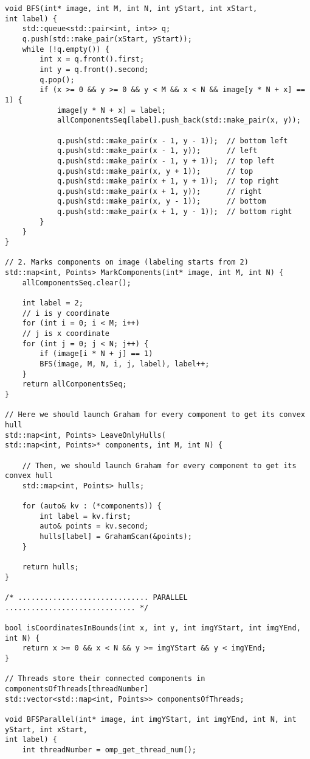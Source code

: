 \documentclass[14pt, russian]{extarticle}
\begin{document}
\begin{lstlisting}
void BFS(int* image, int M, int N, int yStart, int xStart,
int label) {
	std::queue<std::pair<int, int>> q;
	q.push(std::make_pair(xStart, yStart));
	while (!q.empty()) {
		int x = q.front().first;
		int y = q.front().second;
		q.pop();
		if (x >= 0 && y >= 0 && y < M && x < N && image[y * N + x] == 1) {
			image[y * N + x] = label;
			allComponentsSeq[label].push_back(std::make_pair(x, y));
			
			q.push(std::make_pair(x - 1, y - 1));  // bottom left
			q.push(std::make_pair(x - 1, y));      // left
			q.push(std::make_pair(x - 1, y + 1));  // top left
			q.push(std::make_pair(x, y + 1));      // top
			q.push(std::make_pair(x + 1, y + 1));  // top right
			q.push(std::make_pair(x + 1, y));      // right
			q.push(std::make_pair(x, y - 1));      // bottom
			q.push(std::make_pair(x + 1, y - 1));  // bottom right
		}
	}
}

// 2. Marks components on image (labeling starts from 2)
std::map<int, Points> MarkComponents(int* image, int M, int N) {
	allComponentsSeq.clear();
	
	int label = 2;
	// i is y coordinate
	for (int i = 0; i < M; i++)
	// j is x coordinate
	for (int j = 0; j < N; j++) {
		if (image[i * N + j] == 1)
		BFS(image, M, N, i, j, label), label++;
	}
	return allComponentsSeq;
}

// Here we should launch Graham for every component to get its convex hull
std::map<int, Points> LeaveOnlyHulls(
std::map<int, Points>* components, int M, int N) {
	
	// Then, we should launch Graham for every component to get its convex hull
	std::map<int, Points> hulls;
	
	for (auto& kv : (*components)) {
		int label = kv.first;
		auto& points = kv.second;
		hulls[label] = GrahamScan(&points);
	}
	
	return hulls;
}

/* .............................. PARALLEL .............................. */

bool isCoordinatesInBounds(int x, int y, int imgYStart, int imgYEnd, int N) {
	return x >= 0 && x < N && y >= imgYStart && y < imgYEnd;
}

// Threads store their connected components in componentsOfThreads[threadNumber]
std::vector<std::map<int, Points>> componentsOfThreads;

void BFSParallel(int* image, int imgYStart, int imgYEnd, int N, int yStart, int xStart,
int label) {
	int threadNumber = omp_get_thread_num();
	

\end{lstlisting}
\end{document}
